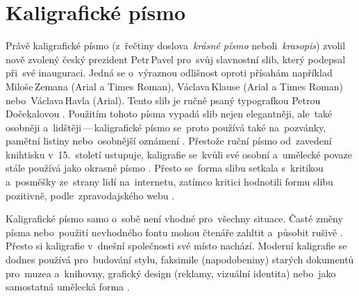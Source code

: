 \documentclass[a4paper, 11pt]{article}
\begin{document}
\section*{Kaligrafické písmo}

Právě kaligrafické písmo (z~řečtiny doslova~\emph{krásné písmo}
neboli~\emph{krasopis}) zvolil nově zvolený český prezident Petr\,Pavel
pro~svůj slavnostní slib, který podepsal 
při~své inauguraci. Jedná se o~výraznou odlišnost oproti přísahám
například Miloše\,Zemana (Arial a Times Roman),
Václava\,Klause (Arial a Times Roman) nebo~Václava\,Havla (Arial).
Tento slib je ručně psaný typografkou Petrou\,Dočekalovou
\parencite{Font:2023:SlibPrezidenta}.
Použitím tohoto písma vypadá slib nejen elegantněji, ale~také osobněji
a~lidštěji\,---\,kaligrafické písmo se~proto používá také
na~pozvánky, pamětní listiny nebo~osobnější oznámení
\parencite{Kaucky:2018:Kaligrafie}.
Přestože ruční písmo od~zavedení knihtisku v~15.\ století ustupuje,
kaligrafie se~kvůli své osobní a~umělecké povaze stále používá jako
okrasné písmo \parencite{Zapf:2007:Alphabet}.
Přesto se~forma slibu setkala s~kritikou a~posměšky ze~strany lidí
na~internetu, zatímco kritici hodnotili formu slibu pozitivně,
podle~zpravodajského webu \textcite{Seznam:2023:KritikaSlibu}.

Kaligrafické písmo samo o~sobě není vhodné pro~všechny situace.
Časté změny písma nebo~použití nevhodného fontu mohou čtenáře zahltit
a~působit rušivě \parencite{Rajlich:1998:TypografiePrelomu}.
Přesto si kaligrafie v~dnešní společnosti své místo nachází.
Moderní kaligrafie se dodnes používá pro~budování stylu,
faksimile (napodobeniny) starých dokumentů pro~muzea a~knihovny,
grafický design (reklamy, vizuální identita) nebo~jako samostatná umělecká
forma \parencite{Kafka:2018:Kaligrafie}.

\newpage
\renewcommand{\refname}{Literatura}
\printbibliography{}
\end{document}
